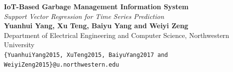 \documentclass[a0b,portrait]{a0poster}
\begin{document}
\begin{minipage}{\linewidth}
\centering
\VeryHuge \color{NavyBlue} \textbf{IoT-Based Garbage Management Information System} \color{Black}\\%
\Huge\textit{Support Vector Regression for Time Series Prediction}\\[1cm] %
\huge \textbf{Yuanhui Yang, Xu Teng, Baiyu Yang and Weiyi Zeng}\\[0.5cm] %
\huge Department of Electrical Engineering and Computer Science, Northwestern University\\[0.4cm] %
\Large \texttt{\{YuanhuiYang2015, XuTeng2015, BaiyuYang2017 and WeiyiZeng2015\}@u.northwestern.edu}\\
\end{minipage}

\vspace{1cm} %

\end{document}
